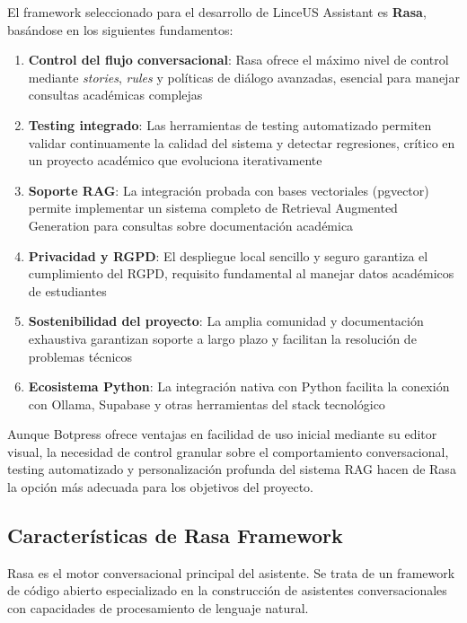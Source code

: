 El framework seleccionado para el desarrollo de LinceUS Assistant es \textbf{Rasa}, basándose en los siguientes fundamentos:

\begin{enumerate}
    \item \textbf{Control del flujo conversacional}: Rasa ofrece el máximo nivel de control mediante \textit{stories}, \textit{rules} y políticas de diálogo avanzadas, esencial para manejar consultas académicas complejas
    
    \item \textbf{Testing integrado}: Las herramientas de testing automatizado permiten validar continuamente la calidad del sistema y detectar regresiones, crítico en un proyecto académico que evoluciona iterativamente
    
    \item \textbf{Soporte RAG}: La integración probada con bases vectoriales (pgvector) permite implementar un sistema completo de Retrieval Augmented Generation para consultas sobre documentación académica
    
    \item \textbf{Privacidad y RGPD}: El despliegue local sencillo y seguro garantiza el cumplimiento del RGPD, requisito fundamental al manejar datos académicos de estudiantes
    
    \item \textbf{Sostenibilidad del proyecto}: La amplia comunidad y documentación exhaustiva garantizan soporte a largo plazo y facilitan la resolución de problemas técnicos
    
    \item \textbf{Ecosistema Python}: La integración nativa con Python facilita la conexión con Ollama, Supabase y otras herramientas del stack tecnológico
\end{enumerate}

Aunque Botpress ofrece ventajas en facilidad de uso inicial mediante su editor visual, la necesidad de control granular sobre el comportamiento conversacional, testing automatizado y personalización profunda del sistema RAG hacen de Rasa la opción más adecuada para los objetivos del proyecto.

\subsection{Características de Rasa Framework}

Rasa es el motor conversacional principal del asistente. Se trata de un framework de código abierto especializado en la construcción de asistentes conversacionales con capacidades de procesamiento de lenguaje natural.

